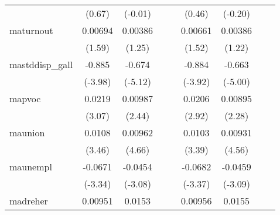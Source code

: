 {\begin{tabular}{l*{8}{c}}
            &      (0.67)         &     (-0.01)         &                     &                     &      (0.46)         &     (-0.20)         &                     &                     \\
[1em]
maturnout   &     0.00694         &     0.00386         &                     &                     &     0.00661         &     0.00386         &                     &                     \\
            &      (1.59)         &      (1.25)         &                     &                     &      (1.52)         &      (1.22)         &                     &                     \\
[1em]
mastddisp\_gall&      -0.885\sym{***}&      -0.674\sym{***}&                     &                     &      -0.884\sym{***}&      -0.663\sym{***}&                     &                     \\
            &     (-3.98)         &     (-5.12)         &                     &                     &     (-3.92)         &     (-5.00)         &                     &                     \\
[1em]
mapvoc      &      0.0219\sym{**} &     0.00987\sym{*}  &                     &                     &      0.0206\sym{**} &     0.00895\sym{*}  &                     &                     \\
            &      (3.07)         &      (2.44)         &                     &                     &      (2.92)         &      (2.28)         &                     &                     \\
[1em]
maunion     &      0.0108\sym{***}&     0.00962\sym{***}&                     &                     &      0.0103\sym{***}&     0.00931\sym{***}&                     &                     \\
            &      (3.46)         &      (4.66)         &                     &                     &      (3.39)         &      (4.56)         &                     &                     \\
[1em]
maunempl    &     -0.0671\sym{***}&     -0.0454\sym{**} &                     &                     &     -0.0682\sym{***}&     -0.0459\sym{**} &                     &                     \\
            &     (-3.34)         &     (-3.08)         &                     &                     &     (-3.37)         &     (-3.09)         &                     &                     \\
[1em]
madreher    &     0.00951         &      0.0153\sym{***}&                     &                     &     0.00956         &      0.0155\sym{***}&                     &                     \\

\end{tabular}}

